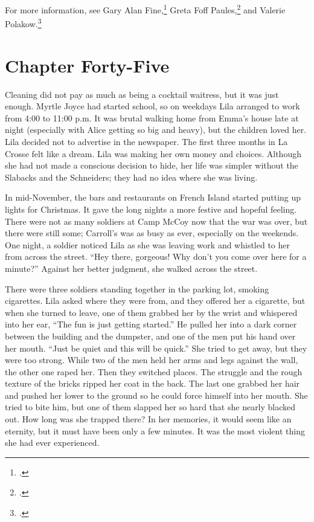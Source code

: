 \documentclass[
  american,
  letterpaper,
]{book}
\begin{document}
For more information, see Gary Alan Fine,\footnote{.} Greta Foff Paules,\footnote{.} and
Valerie Polakow.\footnote{.}


\chapter{Chapter Forty-Five}\label{chapter-forty-five}

Cleaning did not pay as much as being a cocktail waitress, but it was
just enough. Myrtle Joyce had started school, so on weekdays Lila
arranged to work from 4:00 to 11:00 p.m. It was brutal walking home from
Emma's house late at night (especially with Alice getting so big and
heavy), but the children loved her. Lila decided not to advertise in the
newspaper. The first three months in La Crosse felt like a dream. Lila
was making her own money and choices. Although she had not made a
conscious decision to hide, her life was simpler without the Slabacks
and the Schneiders; they had no idea where she was living.

In mid-November, the bars and restaurants on French Island started
putting up lights for Christmas. It gave the long nights a more festive
and hopeful feeling. There were not as many soldiers at Camp McCoy now
that the war was over, but there were still some; Carroll's was as busy
as ever, especially on the weekends. One night, a soldier noticed Lila
as she was leaving work and whistled to her from across the street.
``Hey there, gorgeous! Why don't you come over here for a minute?''
Against her better judgment, she walked across the street.

There were three soldiers standing together in the parking lot, smoking
cigarettes. Lila asked where they were from, and they offered her a
cigarette, but when she turned to leave, one of them grabbed her by the
wrist and whispered into her ear, ``The fun is just getting started.''
He pulled her into a dark corner between the building and the dumpster,
and one of the men put his hand over her mouth. ``Just be quiet and this
will be quick.'' She tried to get away, but they were too strong. While
two of the men held her arms and legs against the wall, the other one
raped her. Then they switched places. The struggle and the rough texture
of the bricks ripped her coat in the back. The last one grabbed her hair
and pushed her lower to the ground so he could force himself into her
mouth. She tried to bite him, but one of them slapped her so hard that
she nearly blacked out. How long was she trapped there? In her memories,
it would seem like an eternity, but it must have been only a few
minutes. It was the most violent thing she had ever experienced.
\end{document}
